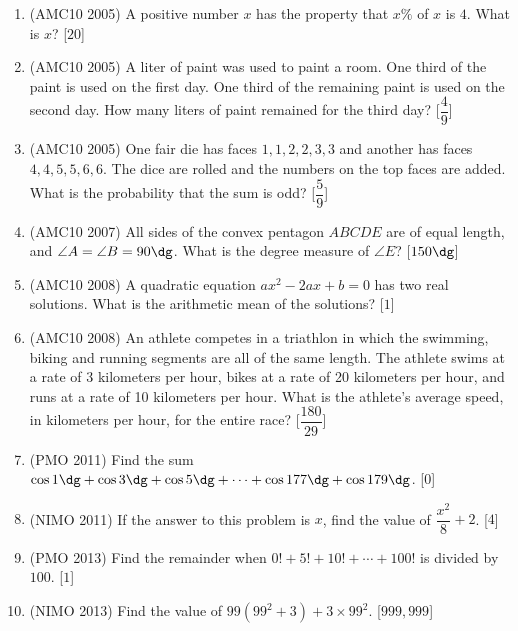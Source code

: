 \documentclass[11pt,paper=letter]{scrartcl}
\begin{document}
\begin{enumerate}

\item (AMC10 2005) A positive number $x$ has the property that $x\%$ of $x$ is $4$. What is $x$? \hfill [$20$]

\item (AMC10 2005) A liter of paint was used to paint a room. One third of the paint is used on the first day. One third of the remaining paint is used on the second day. How many liters of paint remained for the third day? \hfill [$\dfrac{4}{9}$]

\item (AMC10 2005) One fair die has faces $1, 1, 2, 2, 3, 3$ and another has faces $4, 4, 5, 5, 6, 6$. The dice are rolled and the numbers on the top faces are added. What is the probability that the sum is odd? \hfill [$\dfrac{5}{9}$]

\item (AMC10 2007) All sides of the convex pentagon $ABCDE$ are of equal length, and $\angle A = \angle B = 90\dg$. What is the degree measure of $\angle E$? \hfill [$150\dg$]

\item (AMC10 2008) A quadratic equation $ax^2 - 2ax + b = 0$ has two real solutions. What is the arithmetic mean of the solutions? \hfill [$1$]

\item (AMC10 2008) An athlete competes in a triathlon in which the swimming, biking and running segments are all of the same length. The athlete swims at a rate of 3 kilometers per hour, bikes at a rate of 20 kilometers per hour, and runs at a rate of 10 kilometers per hour. What is the athlete's average speed, in kilometers per hour, for the entire race? \hfill [$\dfrac{180}{29}$]

\item (PMO 2011) Find the sum $\cos 1\dg + \cos 3\dg + \cos 5\dg + \cdots + \cos 177\dg + \cos 179\dg$. \hfill [$0$]

\item (NIMO 2011) If the answer to this problem is $x$, find the value of $\dfrac{x^2}{8} + 2$. \hfill [$4$]

\item (PMO 2013) Find the remainder when $0! + 5! + 10! + \cdots + 100!$ is divided by $100$. \hfill [$1$]

\item (NIMO 2013) Find the value of $99(99^2 + 3) + 3 \times 99^2$. \hfill [$999,999$]


\end{enumerate}
\end{document}
